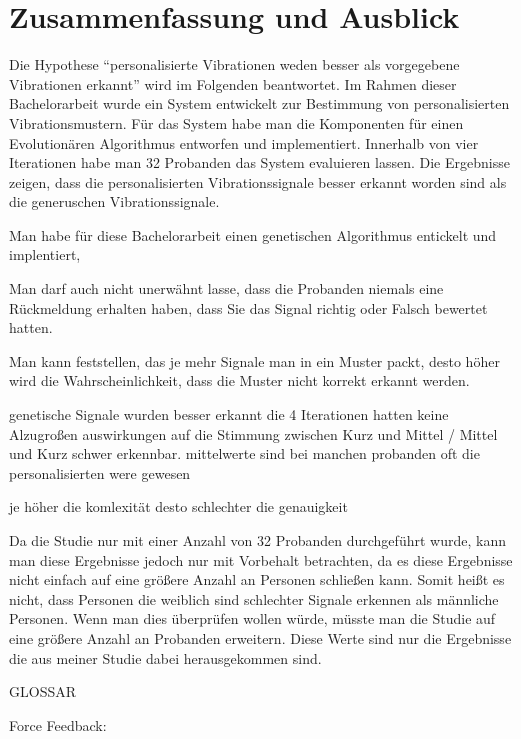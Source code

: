 
\chapter{Zusammenfassung und Ausblick}
\label{ch:Zusammenfassung}


Die Hypothese "`personalisierte Vibrationen weden besser als vorgegebene Vibrationen erkannt"' wird im Folgenden beantwortet.
Im Rahmen dieser Bachelorarbeit wurde ein System entwickelt zur Bestimmung von personalisierten Vibrationsmustern. 
Für das System habe man die Komponenten für einen Evolutionären Algorithmus entworfen und implementiert.
Innerhalb von vier Iterationen habe man 32 Probanden das System evaluieren lassen. 
Die Ergebnisse zeigen, dass die personalisierten Vibrationssignale besser erkannt worden sind als die generuschen Vibrationssignale.

Man habe für diese Bachelorarbeit einen genetischen Algorithmus entickelt und implentiert, 



Man darf auch nicht unerwähnt lasse, dass die Probanden niemals eine Rückmeldung erhalten haben, dass Sie das Signal richtig oder Falsch bewertet hatten.


Man kann feststellen, das je mehr Signale man in ein Muster packt, desto höher wird die Wahrscheinlichkeit, dass die Muster nicht korrekt erkannt werden. 


genetische Signale wurden besser erkannt
die 4 Iterationen hatten keine Alzugroßen auswirkungen auf die Stimmung
zwischen Kurz und Mittel / Mittel und Kurz schwer erkennbar.
mittelwerte sind bei manchen probanden oft die personalisierten were gewesen

je höher die komlexität desto schlechter die genauigkeit



Da die Studie nur mit einer Anzahl von 32 Probanden durchgef{\"u}hrt wurde, kann man diese Ergebnisse jedoch nur mit Vorbehalt betrachten, da es diese Ergebnisse nicht einfach auf eine gr{\"o}{\ss}ere Anzahl an Personen schlie{\ss}en kann. 
Somit hei{\ss}t es nicht, dass Personen die weiblich sind schlechter Signale erkennen als m{\"a}nnliche Personen. Wenn man dies {\"u}berpr{\"u}fen wollen w{\"u}rde, m{\"u}sste man die Studie auf eine gr{\"o}{\ss}ere Anzahl an Probanden erweitern. Diese Werte sind nur die Ergebnisse die aus meiner Studie dabei herausgekommen sind.







GLOSSAR

Force Feedback:

